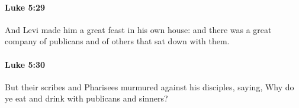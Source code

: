 		\paragraph{Luke 5:29} %
			\label{LUKE-5-29}

			And Levi made him a great feast in his own house: and there was a great company of publicans and of others that sat down with them.

			\begin{framed}
			\scriptsize
				\begin{compactdesc}
					\item[SBLG] 
				\end{compactdesc}
			\end{framed}

		\paragraph{Luke 5:30} %
			\label{LUKE-5-30}

			But their scribes and Pharisees murmured against his disciples, saying, Why do ye eat and drink with publicans and sinners?

